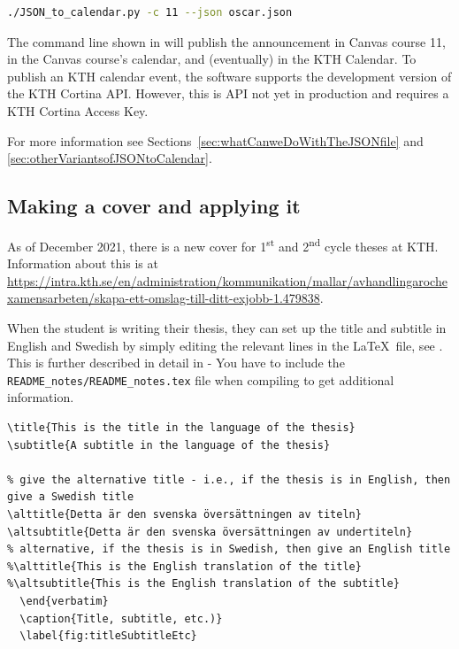 \begin{lstlisting}[language={bash}, caption={JSON\_to\_calendar.py for Oscar}, label=lst:jsonToCalenarforOscar1] 
./JSON_to_calendar.py -c 11 --json oscar.json
\end{lstlisting}
The command line shown in  will publish the announcement in \first Canvas course 11, \Second in the Canvas course’s calendar, and \third (eventually) in the KTH Calendar. To publish an KTH calendar event, the software supports the development version of the KTH Cortina API. However, this is API not yet in production and requires a KTH Cortina Access Key.

 For more information see Sections~\ref{sec:whatCanweDoWithTheJSONfile} and \ref{sec:otherVariantsofJSONtoCalendar}.

\subsection{Making a cover and applying it}
\label{sec:makingACover}
As of December 2021, there is a new cover for 1\textsuperscript{st} and 2\textsuperscript{nd} cycle theses at KTH. Information about this is at \url{https://intra.kth.se/en/administration/kommunikation/mallar/avhandlingarochexamensarbeten/skapa-ett-omslag-till-ditt-exjobb-1.479838}.

When the student is writing their thesis, they can set up the title and subtitle in English and Swedish by simply editing the relevant lines in the \LaTeX~file, see . This is further described in detail in   
{- You have to include the \texttt{README\_notes/README\_notes.tex} file when compiling to get additional information.}

\begin{lstlisting}[language={[LaTeX]TeX}, caption={Title and subtitle in the two languages}, label=lst:titleSubtitleEtc] 
\title{This is the title in the language of the thesis}
\subtitle{A subtitle in the language of the thesis}

% give the alternative title - i.e., if the thesis is in English, then give a Swedish title
\alttitle{Detta är den svenska översättningen av titeln}
\altsubtitle{Detta är den svenska översättningen av undertiteln}
% alternative, if the thesis is in Swedish, then give an English title
%\alttitle{This is the English translation of the title}
%\altsubtitle{This is the English translation of the subtitle}
  \end{verbatim}
  \caption{Title, subtitle, etc.)}
  \label{fig:titleSubtitleEtc}
\end{lstlisting}

